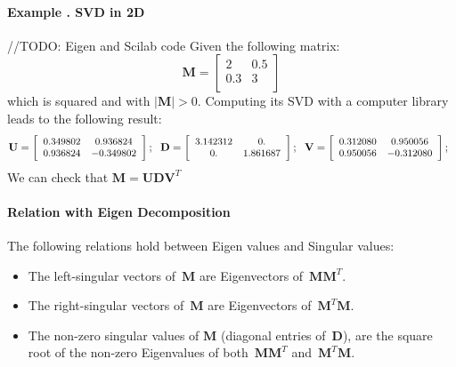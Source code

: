 \paragraph{Example \theexamplecounter. SVD in 2D}
//TODO: Eigen and Scilab code
Given the following matrix: 
\begin{equation}
\mathbf{M} = 
\left[
 \begin{array}{cc}
  2 &  0.5 \\
  0.3 &  3 \\
 \end{array}
 \right]
\end{equation}
which is squared and with $|\mathbf{M}|>0$. Computing its SVD with a computer library leads to the following result: 
\begin{equation}
\small
\mathbf{U} = 
\left[
 \begin{array}{cc}
    0.349802   &  0.936824  \\
    0.936824  & - 0.349802 \\
 \end{array}
 \right];\ \ 
\mathbf{D} = 
\left[
 \begin{array}{cc}
    3.142312   &  0.         \\
    0.          &  1.861687  \\
 \end{array}
 \right];\ \ 
\mathbf{V} = 
\left[
 \begin{array}{cc}
    0.312080 &    0.950056  \\
    0.950056 &  - 0.312080  \\
 \end{array}
 \right];\ \ 
\end{equation}
We can check that $\mathbf{M} = \mathbf{U} \mathbf{D} \mathbf{V}^T$

\paragraph{Relation with Eigen Decomposition}
The following relations hold between Eigen values and Singular values:
\begin{itemize}
 \item The left-singular vectors of~$\mathbf{M}$ are Eigenvectors of~$\mathbf{M}\mathbf{M}^T$. 
 \item The right-singular vectors of~$\mathbf{M}$ are Eigenvectors of~$\mathbf{M}^T\mathbf{M}$.
 \item The non-zero singular values of $\mathbf{M}$ (diagonal entries of~$\mathbf{D}$), are the square root of the non-zero Eigenvalues of both~$\mathbf{M}\mathbf{M}^T$ and~$\mathbf{M}^T\mathbf{M}$. 
\end{itemize}


